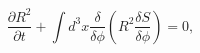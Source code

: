 \begin{equation}
\frac{\partial R^{2}}{\partial t}+\int d^{3}x\frac{\delta}{\delta\phi}\left(
R^{2}\frac{\delta S}{\delta\phi}\right)  =0,\label{5}%
\end{equation}

